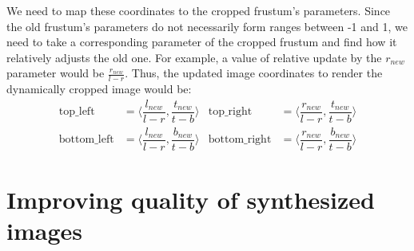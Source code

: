 We need to map these coordinates to the cropped frustum's parameters. Since the old frustum's parameters do not necessarily form ranges between -1 and 1, we need to take a corresponding parameter of the cropped frustum and find how it relatively adjusts the old one. For example, a value of relative update by the $r_{new}$ parameter would be $\tfrac{r_{new}}{l - r}$. Thus, the updated image coordinates to render the dynamically cropped image would be:
\begin{align}
	\text{top{\_}left} &= \langle \dfrac{l_{new}}{l - r}, \dfrac{t_{new}}{t - b} \rangle & \text{top{\_}right} &= \langle \dfrac{r_{new}}{l - r}, \dfrac{t_{new}}{t - b} \rangle \\
	\text{bottom{\_}left} &= \langle \dfrac{l_{new}}{l - r}, \dfrac{b_{new}}{t - b} \rangle & \text{bottom{\_}right} &= \langle \dfrac{r_{new}}{l - r}, \dfrac{b_{new}}{t - b} \rangle
\end{align}



\section{Improving quality of synthesized images}\label{methods:zooms}



